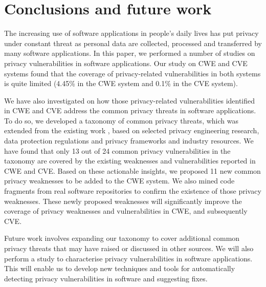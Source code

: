 \section{Conclusions and future work} \label{sec:conclusion}

The increasing use of software applications in people's daily lives has put privacy under constant threat as personal data are collected, processed and transferred by many software applications. In this paper, we performed a number of studies on privacy vulnerabilities  in software applications. Our study on CWE and CVE systems found that the coverage of privacy-related vulnerabilities in both systems is quite limited (4.45\% in the CWE system and 0.1\% in the CVE system).

We have also investigated on how those privacy-related vulnerabilities identified in CWE and CVE address the common privacy threats in software applications. To do so, we developed a taxonomy of common privacy threats, which was extended from the existing work \cite{Stallings2019}, based on selected privacy engineering research, data protection regulations and privacy frameworks and industry resources. %
We have found that only 13 out of 24 common privacy vulnerabilities in the taxonomy are covered by the existing weaknesses and vulnerabilities reported in CWE and CVE. %
Based on these actionable insights, we proposed 11 new common privacy weaknesses to be added to the CWE system. We also mined code fragments from real software repositories to confirm the existence of those privacy weaknesses. These newly proposed weaknesses will significantly improve the coverage of privacy weaknesses and vulnerabilities in CWE, and subsequently CVE.

Future work involves expanding our taxonomy to cover additional common privacy threats that may have raised or discussed in other sources. We will also perform a study to characterise privacy vulnerabilities in software applications. This will enable us to develop new techniques and tools for automatically detecting privacy vulnerabilities in software and suggesting fixes.

